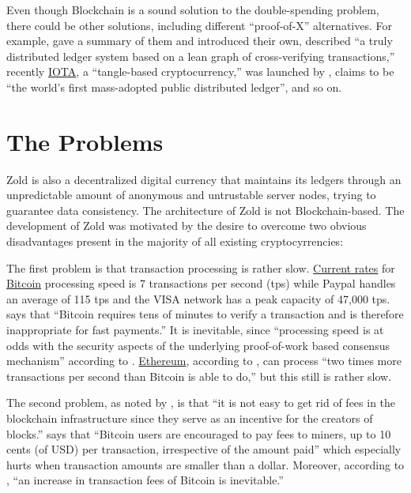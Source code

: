 \documentclass[12pt,oneside]{article}
\begin{document}
Even though Blockchain is a sound solution to the double-spending
problem, there could be other solutions,
including different ``proof-of-X'' alternatives.
For example,  gave
a summary of them and introduced their own,
 described
``a truly distributed ledger system based on a lean graph of cross-verifying transactions,''
recently \href{https://www.iota.org/}{IOTA}, a ``tangle-based cryptocurrency,'' was launched by
,
 claims to be ``the world's first mass-adopted public distributed ledger'',
and so on.

\pagebreak

\section*{The Problems}

Zold is also a decentralized digital currency that maintains its ledgers
through an unpredictable amount of anonymous and untrustable server nodes, trying to guarantee
data consistency. The architecture of Zold is not Blockchain-based.
The development of Zold was motivated by the desire to overcome
two obvious disadvantages present in the majority of all existing cryptocyrrencies:

The first problem is that transaction processing is rather slow.
\href{https://goo.gl/sWiAWc}{Current rates} for \href{https://bitcoin.org/}{Bitcoin}
processing speed is 7 transactions per second (tps)
while Paypal handles an average of 115 tps and the VISA
network has a peak capacity of 47,000 tps.
 says that
``Bitcoin requires tens of minutes to verify a transaction
and is therefore inappropriate for fast payments.''
It is inevitable, since
``processing speed is at odds with the security aspects of the underlying
proof-of-work based consensus mechanism'' according
to .
\href{https://ethereum.org/}{Ethereum}, according to , can process
``two times more transactions per second than Bitcoin is able to do,''
but this still is rather slow.

The second problem, as noted by ,
is that ``it is not easy to get rid
of fees in the blockchain infrastructure since they serve
as an incentive for the creators of blocks.''
 says that ``Bitcoin users are encouraged to
pay fees to miners, up to 10 cents (of USD) per transaction, irrespective of the
amount paid'' which especially hurts when transaction amounts are smaller than a dollar.
Moreover, according to ,
``an increase in transaction fees of Bitcoin is inevitable.''
\end{document}
